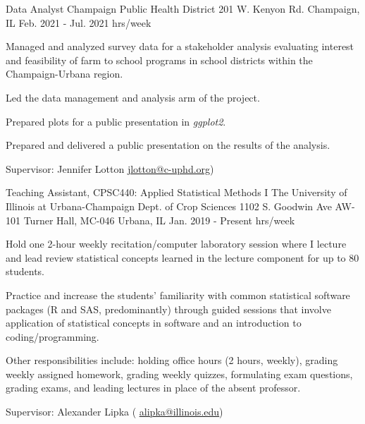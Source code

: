\begin{cventries}
  \cventry
    {Data Analyst}%
    {Champaign Public Health District } %
    {201 W. Kenyon Rd. \newline
    Champaign, IL} %
    {Feb. 2021 - Jul. 2021  hrs/week} %
    {
      \begin{cvitems} %
        \item {Managed and analyzed survey data for a stakeholder analysis evaluating interest and feasibility of farm to school programs in school districts within the Champaign-Urbana region.}
        \item{Led the data management and analysis arm of the project.}
        \item{Prepared plots for a public presentation in \textit{ggplot2}.}
        \item{Prepared and delivered a public presentation on the results of the analysis.}
        \item {Supervisor: Jennifer Lotton \textcolor{navyblue}{\underline{\href{mailto:jlotton@c-uphd.org}{jlotton@c-uphd.org}}})}
      \end{cvitems}
    }



  \cventry
    {Teaching Assistant, CPSC440: Applied Statistical Methods I} %
    {The University of Illinois at Urbana-Champaign \newline Dept. of Crop Sciences } %
    {1102 S. Goodwin Ave \newline AW-101 Turner Hall, MC-046
    Urbana, IL} %
    {Jan. 2019 - Present  hrs/week} %
    {
      \begin{cvitems} %
        \item {Hold one 2-hour weekly recitation/computer laboratory session where I lecture and lead review statistical concepts learned in the lecture component for up to 80 students.}
        \item {Practice and increase the students’ familiarity with common statistical software packages (R and SAS, predominantly) through guided sessions that involve application of statistical concepts in software and an introduction to coding/programming.}
        \item {Other responsibilities include: holding office hours (2 hours, weekly), grading weekly assigned homework, grading weekly quizzes, formulating exam questions, grading exams, and leading lectures in place of the absent professor.}
        \item {Supervisor: Alexander Lipka ( \textcolor{navyblue}{\underline{\href{mailto:alipka@illinois.edu}{alipka@illinois.edu}}})}
      \end{cvitems}
    }




\end{cventries}
